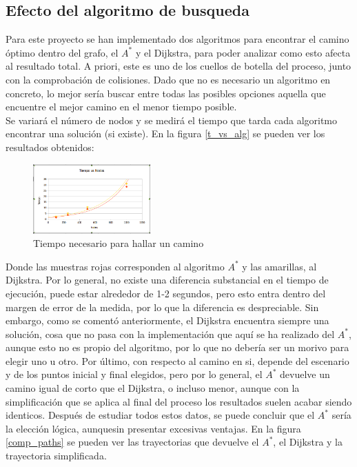 \subsection{Efecto del algoritmo de busqueda}

Para este proyecto se han implementado dos algoritmos para encontrar el camino óptimo dentro del grafo, el $A^*$ y el Dijkstra, para poder analizar como esto afecta al resultado total. A priori, este es uno de los cuellos de botella del proceso, junto con la comprobación de colisiones. Dado que no es necesario un algoritmo en concreto, lo mejor sería buscar entre todas las posibles opciones aquella que encuentre el mejor camino en el menor tiempo posible.\\

Se variará el número de nodos y se medirá el tiempo que tarda cada algoritmo encontrar una solución (si existe). En la figura \ref{t_vs_alg} se pueden ver los resultados obtenidos:\\

\begin{figure}[H]
		\centering
        \includegraphics[width=0.4\textwidth]{images/t_vs_nodos_vs_alg.png}
        \caption{Tiempo necesario para hallar un camino}
        \label{fig:t_vs_alg}
\end{figure}

Donde las muestras rojas corresponden al algoritmo $A^*$ y las amarillas, al Dijkstra. Por lo general, no existe una diferencia substancial en el tiempo de ejecución, puede estar alrededor de 1-2 segundos, pero esto entra dentro del margen de error de la medida, por lo que la diferencia es despreciable. Sin embargo, como se comentó anteriormente, el Dijkstra encuentra siempre una solución, cosa que no pasa con la implementación que aquí se ha realizado del $A^*$, aunque esto no es propio del algoritmo, por lo que no debería ser un morivo para elegir uno u otro. Por último, con respecto al camino en si, depende del escenario y de los puntos inicial y final elegidos, pero por lo general, el $A^*$ devuelve un camino igual de corto que el Dijkstra, o incluso menor, aunque con la simplificación que se aplica al final del proceso los resultados suelen acabar siendo identicos. Después de estudiar todos estos datos, se puede concluir que el  $A^*$ sería la elección lógica, aunquesin presentar excesivas ventajas. En la figura \ref{comp_paths} se pueden ver las trayectorias que devuelve el  $A^*$, el Dijkstra y la trayectoria simplificada.\\


